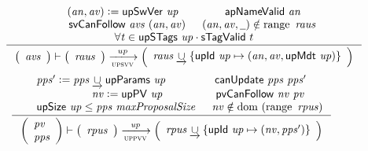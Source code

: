 \begin{figure}[htb]
  \begin{equation}
    \label{eq:rule:up-av-validity}
    \inference
    {
      (\var{an}, \var{av}) \leteq \upSwVer{up}
      & \fun{apNameValid}~\var{an}\\
      & \fun{svCanFollow}~\var{avs}~(\var{an}, \var{av})
      & (\var{an}, \var{av}, \wcard) \notin \range~\var{raus}\\
      \forall \var{t} \in \fun{upSTags}~\var{up} \cdot \fun{sTagValid}~t
    }
    {
      {\left(
        \begin{array}{l}
          \var{avs}
        \end{array}
      \right)}
      \vdash
      {
        \left(
          \begin{array}{l}
            \var{raus}
          \end{array}
        \right)
      }
      \trans{upsvv}{up}
      {
        \left(
          \begin{array}{l}
            \var{raus} \unionoverrideRight \{ \upId{up} \mapsto (\var{an}, \var{av}, \upMetadata{up})\}
          \end{array}
        \right)
      }
    }
  \end{equation}
  \nextdef
    \begin{equation}
    \label{eq:rule:up-pv-validity}
    \inference
    {
      \var{pps'} \leteq \var{pps} \unionoverrideRight \upParams{up}
      & \fun{canUpdate}~\var{pps}~\var{pps'}\\
      & \var{nv} \leteq \upPV{up}
      & \fun{pvCanFollow}~\var{nv}~\var{pv}\\
      & \upSize{up} \leq \var{pps}~\var{maxProposalSize}
      & \var{nv} \notin \dom~(\range~\var{rpus})
    }
    {
      {\left(
        \begin{array}{l}
          \var{pv}\\
          \var{pps}
        \end{array}
      \right)}
      \vdash
      {
        \left(
          \begin{array}{l}
            \var{rpus}
          \end{array}
        \right)
      }
      \trans{uppvv}{\var{up}}
      {
        \left(
          \begin{array}{l}
            \var{rpus} \unionoverrideRight
            \{ \upId{up} \mapsto (\var{nv}, \var{pps'}) \}
          \end{array}
        \right)
      }
    }
  \end{equation}

\end{figure}
